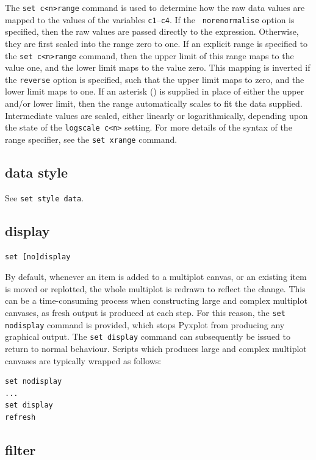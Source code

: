 The {\tt set c<n>range} command is used to determine how the raw data values
are mapped to the values of the variables {\tt c1}--{\tt c4}. If the {\tt
no\-renor\-malise} option is specified, then the raw values are passed directly
to the expression. Otherwise, they are first scaled into the range zero to one.
If an explicit range is specified to the {\tt set c<n>range} command, then the
upper limit of this range maps to the value one, and the lower limit maps to
the value zero. This mapping is inverted if the {\tt reverse} option is
specified, such that the upper limit maps to zero, and the lower limit maps to
one. If an asterisk ({\tt *}) is supplied in place of either the upper and/or
lower limit, then the range automatically scales to fit the data supplied.
Intermediate values are scaled, either linearly or logarithmically, depending
upon the state of the {\tt logscale c<n>} setting. For more details of the
syntax of the range specifier, see the {\tt set xrange} command.


\subsection{data style}

See {\tt set style data}.


\subsection{display}

\begin{verbatim}
set [no]display
\end{verbatim}

By default, whenever an item is added to a multiplot canvas, or an existing
item is moved or replotted, the whole multiplot is redrawn to reflect the
change.  This can be a time-consuming process when constructing large and
complex multiplot canvases, as fresh output is produced at each step. For this
reason, the {\tt set nodisplay} command is provided, which stops Pyxplot from
producing any graphical output. The {\tt set display} command can subsequently
be issued to return to normal behaviour. Scripts which produces large and
complex multiplot canvases are typically wrapped as follows:

\begin{verbatim}
set nodisplay
...
set display
refresh
\end{verbatim}


\subsection{filter}


